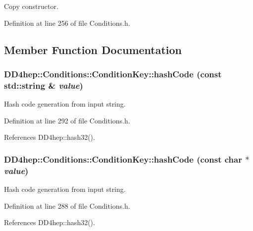 Copy constructor. 

Definition at line 256 of file Conditions.h.

\subsection{Member Function Documentation}
\hypertarget{class_d_d4hep_1_1_conditions_1_1_condition_key_a1420df2db54a634af5aa8a033e080c54}{
\subsubsection[{hashCode}]{ DD4hep::Conditions::ConditionKey::hashCode (const std::string \& {\em value})}}
\label{class_d_d4hep_1_1_conditions_1_1_condition_key_a1420df2db54a634af5aa8a033e080c54}


Hash code generation from input string. 

Definition at line 292 of file Conditions.h.

References DD4hep::hash32().\hypertarget{class_d_d4hep_1_1_conditions_1_1_condition_key_a1aaef3356d9fd2475b02e3c01c64e46a}{
\subsubsection[{hashCode}]{ DD4hep::Conditions::ConditionKey::hashCode (const char $\ast$ {\em value})}}
\label{class_d_d4hep_1_1_conditions_1_1_condition_key_a1aaef3356d9fd2475b02e3c01c64e46a}


Hash code generation from input string. 

Definition at line 288 of file Conditions.h.

References DD4hep::hash32().

